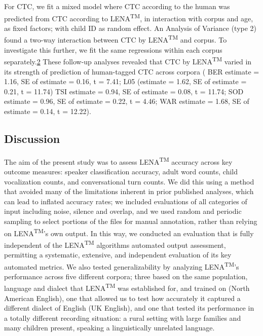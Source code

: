 \documentclass[english,floatsintext,man]{apa6}
\begin{document}
For CTC, we fit a mixed model where CTC according to the human was
predicted from CTC according to LENA\textsuperscript{TM}, in interaction
with corpus and age, as fixed factors; with child ID as random effect.
An Analysis of Variance (type 2) found a two-way interaction between CTC
by LENA\textsuperscript{TM} and corpus. To investigate this further, we
fit the same regressions within each corpus
separately.\href{For\%20both\%20TSI\%20and\%20WAR,\%20the\%20variance\%20associated\%20to\%20the\%20child\%20ID\%20random\%20factor\%20was\%20zero.\%20This\%20suggests\%20a\%20mixed\%20model\%20was\%20not\%20necessary,\%20as\%20child\%20ID\%20is\%20not\%20explaining\%20any\%20additional\%20variance,\%20but\%20it\%20does\%20not\%20alter\%20the\%20interpretation\%20in\%20the\%20main\%20text.}{2}
These follow-up analyses revealed that CTC by LENA\textsuperscript{TM}
varied in its strength of prediction of human-tagged CTC across corpora
( BER estimate = 1.16, SE of estimate = 0.16, t = 7.41; L05 (estimate =
1.62, SE of estimate = 0.21, t = 11.74) TSI estimate = 0.94, SE of
estimate = 0.08, t = 11.74; SOD estimate = 0.96, SE of estimate = 0.22,
t = 4.46; WAR estimate = 1.68, SE of estimate = 0.14, t = 12.22).

\subsection{Discussion}\label{discussion}

The aim of the present study was to assess LENA\textsuperscript{TM}
accuracy across key outcome measures: speaker classification accuracy,
adult word counts, child vocalization counts, and conversational turn
counts. We did this using a method that avoided many of the limitations
inherent in prior published analyses, which can lead to inflated
accuracy rates; we included evaluations of all categories of input
including noise, silence and overlap, and we used random and periodic
sampling to select portions of the files for manual annotation, rather
than relying on LENA\textsuperscript{TM}'s own output. In this way, we
conducted an evaluation that is fully independent of the
LENA\textsuperscript{TM} algorithms automated output assessment,
permitting a systematic, extensive, and independent evaluation of its
key automated metrics. We also tested generalizability by analyzing
LENA\textsuperscript{TM}'s performance across five different corpora;
three based on the same population, language and dialect that
LENA\textsuperscript{TM} was established for, and trained on (North
American English), one that allowed us to test how accurately it
captured a different dialect of English (UK English), and one that
tested its performance in a totally different recording situation: a
rural setting with large families and many children present, speaking a
linguistically unrelated language.
\end{document}
